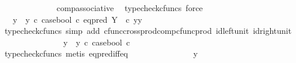\begin{isabellebody}
\ \ \ \ \ \ \ \ \ \ \ \ \isamarkupfalse%
\ comp{\isacharunderscore}{\kern0pt}associative{}\ \isamarkupfalse%
\ {\isacharparenleft}{\kern0pt}typecheck{\isacharunderscore}{\kern0pt}cfuncs{\isacharcomma}{\kern0pt}\ force{\isacharparenright}{\kern0pt}\isanewline
\ \ \ \ \ \ \ \ \ \ \isamarkupfalse%
\ \isamarkupfalse%
\ {\isachardoublequoteopen}{\isachardot}{\kern0pt}{\isachardot}{\kern0pt}{\isachardot}{\kern0pt}\ {\isacharequal}{\kern0pt}\ {\isacharparenleft}{\kern0pt}y{}\ {\isasymamalg}\ y{}{\isacharparenright}{\kern0pt}\ {\isasymcirc}\isactrlsub c\ case{\isacharunderscore}{\kern0pt}bool\ {\isasymcirc}\isactrlsub c\ eq{\isacharunderscore}{\kern0pt}pred\ Y\ \ {\isasymcirc}\isactrlsub c\ {\isasymlangle}y{}{\isacharcomma}{\kern0pt}y{}{\isasymrangle}{\isachardoublequoteclose}\isanewline
\ \ \ \ \ \ \ \ \ \ \ \ \isamarkupfalse%
\ {\isacharparenleft}{\kern0pt}typecheck{\isacharunderscore}{\kern0pt}cfuncs{\isacharcomma}{\kern0pt}\ simp\ add{\isacharcolon}{\kern0pt}\ cfunc{\isacharunderscore}{\kern0pt}cross{\isacharunderscore}{\kern0pt}prod{\isacharunderscore}{\kern0pt}comp{\isacharunderscore}{\kern0pt}cfunc{\isacharunderscore}{\kern0pt}prod\ id{\isacharunderscore}{\kern0pt}left{\isacharunderscore}{\kern0pt}unit{}\ id{\isacharunderscore}{\kern0pt}right{\isacharunderscore}{\kern0pt}unit{}{\isacharparenright}{\kern0pt}\isanewline
\ \ \ \ \ \ \ \ \ \ \isamarkupfalse%
\ \isamarkupfalse%
\ {\isachardoublequoteopen}{\isachardot}{\kern0pt}{\isachardot}{\kern0pt}{\isachardot}{\kern0pt}\ {\isacharequal}{\kern0pt}\ {\isacharparenleft}{\kern0pt}y{}\ {\isasymamalg}\ y{}{\isacharparenright}{\kern0pt}\ {\isasymcirc}\isactrlsub c\ case{\isacharunderscore}{\kern0pt}bool\ {\isasymcirc}\isactrlsub c\ {\isasymt}{\isachardoublequoteclose}\isanewline
\ \ \ \ \ \ \ \ \ \ \ \ \isamarkupfalse%
\ {\isacharparenleft}{\kern0pt}typecheck{\isacharunderscore}{\kern0pt}cfuncs{\isacharcomma}{\kern0pt}\ metis\ eq{\isacharunderscore}{\kern0pt}pred{\isacharunderscore}{\kern0pt}iff{\isacharunderscore}{\kern0pt}eq{\isacharparenright}{\kern0pt}\isanewline
\ \ \ \ \ \ \ \ \ \ \isamarkupfalse%
\ \isamarkupfalse%
\ {\isachardoublequoteopen}{\isachardot}{\kern0pt}{\isachardot}{\kern0pt}{\isachardot}{\kern0pt}\ {\isacharequal}{\kern0pt}\ y{}{\isachardoublequoteclose}\isanewline
\ \ \ \ \ \ \ \ \ \ \ \ \isamarkupfalse%

\end{isabellebody}
